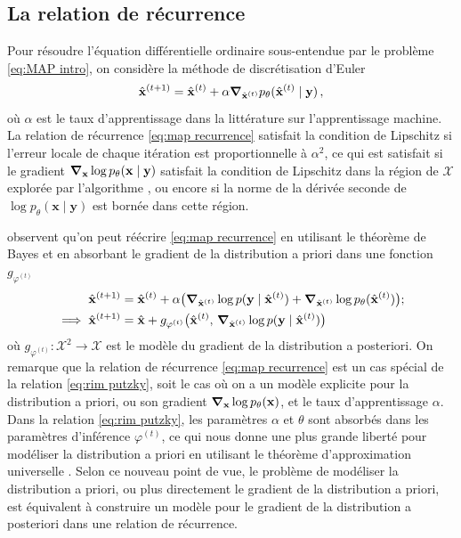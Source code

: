 \subsection{La relation de récurrence}
Pour résoudre l'équation différentielle ordinaire sous-entendue par le problème \eqref{eq:MAP intro}, 
on considère la méthode de discrétisation d'Euler 
\begin{equation}\label{eq:map recurrence}
        \hat{\mathbf{x}}^{(t+1)} = \hat{\mathbf{x}}^{(t)} + \alpha \grad_{\hat{\mathbf{x}}^{(t)}} p_\theta(\hat{\mathbf{x}}^{(t)} \mid \mathbf{y})\, ,
\end{equation} 
où $\alpha$ est le taux d'apprentissage dans la littérature sur 
l'apprentissage machine.
La relation de récurrence \eqref{eq:map recurrence} satisfait la condition de Lipschitz 
si l'erreur locale de chaque itération est proportionnelle à $\alpha^{2}$, ce qui est 
satisfait si le gradient $\grad_{\mathbf{x}}\log p_\theta(\mathbf{x} \mid \mathbf{y})$ 
satisfait la condition de Lipschitz dans la région de $\mathcal{X}$ explorée par l'algorithme \citep{Atkinson1989,Butcher2016}, 
ou encore si la norme de la dérivée seconde de $\log p_\theta(\mathbf{x} \mid \mathbf{y})$ est bornée dans cette région.

\citet{Putzky2017} observent qu'on peut réécrire \eqref{eq:map recurrence} en utilisant le théorème de Bayes et 
en absorbant le gradient de la distribution a priori dans une fonction $g_{\varphi^{(t)}}$
\begin{align}
        \hat{\mathbf{x}}^{(t+1)} &= 
        \hat{\mathbf{x}}^{(t)} + \alpha \big( \grad_{\hat{\mathbf{x}}^{(t)}}\log p(\mathbf{y} \mid \hat{\mathbf{x}}^{(t)}) 
        +  \grad_{\hat{\mathbf{x}}^{(t)}}\log p_\theta(\hat{\mathbf{x}}^{(t)})\big);\\
        \label{eq:rim putzky}
        \implies \hat{\mathbf{x}}^{(t+1)} &= \hat{\mathbf{x}} + g_{\varphi^{(t)}}\big(\hat{\mathbf{x}}^{(t)},\, \grad_{\hat{\mathbf{x}}^{(t)}} \log p(\mathbf{y} \mid \hat{\mathbf{x}}^{(t)})\big)
\end{align}
où $g_{\varphi^{(t)}}: \mathcal{X}^{2} \rightarrow \mathcal{X}$ est le modèle du gradient de la distribution 
a posteriori. 
On remarque que la relation de récurrence \eqref{eq:map recurrence} est un cas spécial de la relation \eqref{eq:rim putzky}, 
soit le cas où on a un modèle explicite pour la distribution a priori, ou son gradient $\grad_{\mathbf{x}} \log p_\theta(\mathbf{x})$,
et le taux d'apprentissage $\alpha$. 
Dans la relation \eqref{eq:rim putzky}, les paramètres $\alpha$ et $\theta$ sont absorbés dans les paramètres d'inférence $\varphi^{(t)}$, ce qui nous donne 
une plus grande liberté pour modéliser la distribution a priori en utilisant le théorème d'approximation universelle \citep{Cybenko1989,Hornik1991}. 
Selon ce nouveau point de vue, 
le problème de modéliser la distribution a priori, ou plus directement le gradient de la distribution a priori, 
est équivalent à construire un modèle pour le gradient de la distribution a posteriori dans une relation 
de récurrence.

